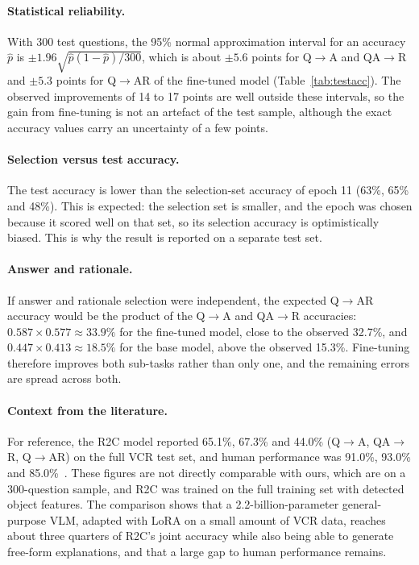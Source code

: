 \documentclass[12pt,a4paper,oneside]{report}
\newcommand{\QtoA}{Q$\rightarrow$A}
\newcommand{\QAtoR}{QA$\rightarrow$R}
\newcommand{\QtoAR}{Q$\rightarrow$AR}
\begin{document}
\paragraph{Statistical reliability.} With 300 test questions, the 95\% normal
approximation interval for an accuracy $\hat{p}$ is
$\pm 1.96\sqrt{\hat{p}(1-\hat{p})/300}$, which is about $\pm 5.6$ points for
\QtoA{} and \QAtoR{} and $\pm 5.3$ points for \QtoAR{} of the fine-tuned model
(Table~\ref{tab:testacc}). The observed improvements of 14 to 17 points are
well outside these intervals, so the gain from fine-tuning is not an artefact of
the test sample, although the exact accuracy values carry an uncertainty of a
few points.

\paragraph{Selection versus test accuracy.} The test accuracy is lower than the
selection-set accuracy of epoch 11 (63\%, 65\% and 48\%). This is expected: the
selection set is smaller, and the epoch was chosen because it scored well on
that set, so its selection accuracy is optimistically biased. This is why the
result is reported on a separate test set.

\paragraph{Answer and rationale.} If answer and rationale selection were
independent, the expected \QtoAR{} accuracy would be the product of the \QtoA{}
and \QAtoR{} accuracies: $0.587 \times 0.577 \approx 33.9\%$ for the fine-tuned
model, close to the observed 32.7\%, and $0.447 \times 0.413 \approx 18.5\%$ for
the base model, above the observed 15.3\%. Fine-tuning therefore improves both
sub-tasks rather than only one, and the remaining errors are spread across both.

\paragraph{Context from the literature.} For reference, the R2C model reported
65.1\%, 67.3\% and 44.0\% (\QtoA, \QAtoR, \QtoAR) on the full VCR test set, and
human performance was 91.0\%, 93.0\% and 85.0\%~\cite{zellers2019vcr}. These
figures are not directly comparable with ours, which are on a 300-question
sample, and R2C was trained on the full training set with detected object
features. The comparison shows that a 2.2-billion-parameter general-purpose VLM,
adapted with LoRA on a small amount of VCR data, reaches about three quarters of
R2C's joint accuracy while also being able to generate free-form explanations,
and that a large gap to human performance remains.
\end{document}
